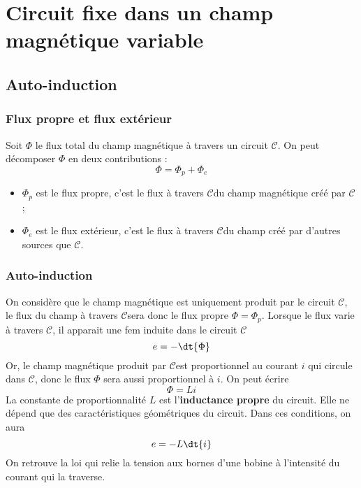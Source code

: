 \documentclass{cours}
\begin{document}
\newcommand{\cc}{\ensuremath{\mathscr{C}}}

\setcounter{chapter}{25}
\chapter{Circuit fixe dans un champ magnétique variable}
\section{Auto-induction}%
\label{sec:auto_induction}

\subsection{Flux propre et flux extérieur}%
\label{sub:flux_propre_et_flux_exterieur}
Soit $\Phi$ le flux total du champ magnétique à travers un circuit \cc. On peut décomposer $\Phi$ en deux contributions : 
\begin{equation}
  \Phi = \Phi_p + \Phi_e
\end{equation}
\begin{itemize}
  \item $\Phi_p$ est le flux propre, c'est le flux à travers \cc du champ magnétique créé par \cc ;
  \item $\Phi_e$ est le flux extérieur, c'est le flux à travers \cc du champ créé par d'autres sources que \cc.
\end{itemize}

\subsection{Auto-induction}%
\label{sub:auto_induction}
 
On considère que le champ magnétique est uniquement produit par le circuit \cc, le flux du champ à travers \cc sera donc le flux propre $\Phi = \Phi_p$. Lorsque le flux varie à travers \cc, il apparait une fem induite dans le circuit \cc
\begin{equation}
  e = -\dt{\Phi}
\end{equation}
Or, le champ magnétique produit par \cc est proportionnel au courant $i$ qui circule dans \cc, donc le flux $\Phi$ sera aussi proportionnel à $i$.  On peut écrire 
\begin{equation}
  \Phi = Li
\end{equation}
La constante de proportionnalité $L$ est l'\textbf{inductance propre} du circuit. Elle ne dépend que des caractéristiques géométriques du circuit. Dans ces conditions, on aura
\begin{equation}
\label{eq:autoinduction}
e = -L\dt{i}
\end{equation}
On retrouve la loi qui relie la tension aux bornes d'une bobine à l'intensité du courant qui la traverse. 
\end{document}
